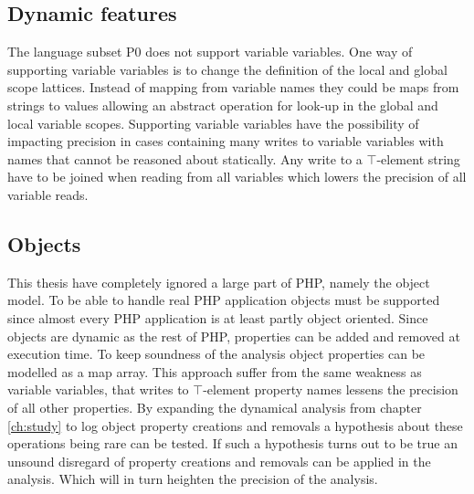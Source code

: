 \subsection{Dynamic features}
The language subset P0 does not support variable variables. One way of supporting variable variables is to change the definition of the local and global scope lattices. Instead of mapping from variable names they could be maps from strings to values allowing an abstract operation for look-up in the global and local variable scopes. Supporting variable variables have the possibility of impacting precision in cases containing many writes to variable variables with names that cannot be reasoned about statically. Any write to a $\top$-element string have to be joined when reading from all variables which lowers the precision of all variable reads.




\subsection{Objects}
This thesis have completely ignored a large part of PHP, namely the object model. To be able to handle real PHP application objects must be supported since almost every PHP application is at least partly object oriented. Since objects are dynamic as the rest of PHP, properties can be added and removed at execution time. To keep soundness of the analysis object properties can be modelled as a map array. This approach suffer from the same weakness as variable variables, that writes to $\top$-element property names lessens the precision of all other properties. By expanding the dynamical analysis from chapter \ref{ch:study} to log object property creations and removals a hypothesis about these operations being rare can be tested. If such a hypothesis turns out to be true an unsound disregard of property creations and removals can be applied in the analysis. Which will in turn heighten the precision of the analysis.

